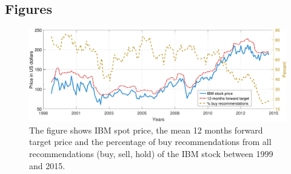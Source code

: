 \clearpage
\newpage

\subsection{Figures}

\begin{figure}[ht!]
	\centering
	\includegraphics[width=1\linewidth]{../plots/IBM_price_plot}
	\caption[Spot price, 12 months forward target price and percentage of buy recommendations of the IBM stock (monthly data) between 1999 and 2015]{The figure shows IBM spot price, the mean 12 months forward target price and the percentage of buy recommendations from all recommendations (buy, sell, hold) of the IBM stock between 1999 and 2015.}
	\label{fig:ibmpriceplot}
\end{figure}

